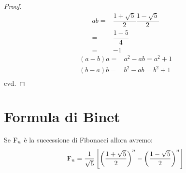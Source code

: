 \begin{proof}
	\begin{align*}
		ab={}&\dfrac{1+\sqrt{5}}{2}\dfrac{1-\sqrt{5}}{2}\\
		={}&\dfrac{1-5}{4}\\
		={}&-1
	\end{align*}
	\begin{align*}
		(a-b)a={}&a^2-ab=a^2+1\\
		(b-a)b={}&b^2-ab=b^2+1\\
	\end{align*}
	cvd.
\end{proof}
\section{Formula di Binet}
\begin{thm}
	Se $\mathrm{F}_{n}$ è la successione di Fibonacci allora avremo:
	\begin{equation}
		\mathrm{F}_{n}=\dfrac{1}{\sqrt{5}}\left[\left(\dfrac{1+\sqrt{5}}{2}\right)^n-\left(\dfrac{1-\sqrt{5}}{2}\right)^n\right]
	\end{equation}\label{eqn:FinBinet}
\end{thm}~\cite{Conti2020}

